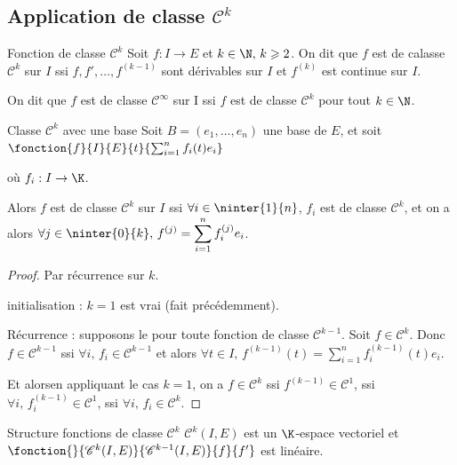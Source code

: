 \subsection{Application de classe \texorpdfstring{$\mathscr C^k$}{Ck}}

\begin{definition}{Fonction de classe $\mathscr C^k$}{}
    Soit $f : I \to E$ et $k \in \N, \, k \geqslant 2$. On dit que $f$ est de calasse 
    $\mathscr C^k$ sur $I$ ssi $f, f', \ldots, f^{(k-1)}$ sont dérivables sur $I$ et $f^{(k)}$ est continue sur $I$.

    On dit que $f$ est de classe $\mathscr C^\infty$ sur I ssi $f$ est de classe 
    $\mathscr C^k$ pour tout $k \in \N$.
\end{definition}

\begin{proposition}{Classe $\mathscr C^k$ avec une base }{}
    Soit $B = (e_1, \ldots, e_n)$ une base de $E$, et soit
    $\fonction{f}{I}{E}{t}{\sum_{i=1}^n f_i(t)e_i}$ 
    
    où $f_i : I \to \K$.

    Alors $f$ est de classe $\mathscr C^k$ sur $I$ ssi $\forall i \in \ninter{1}{n}$, $f_i$ est de classe $\mathscr C^k$, 
    et on a alors $\displaystyle \forall j \in \ninter{0}{k}, \, f^{(j)} = \sum_{i=1}^n f_i^{(j)}e_i$.
\end{proposition}


\begin{proof}
    Par récurrence sur $k$. 

    initialisation : $k = 1$ est vrai (fait précédemment).

    Récurrence : supposons le pour toute fonction de classe $\mathscr C^{k - 1} $. Soit 
    $f \in \mathscr C^k$. Donc $f \in \mathscr C^{k-1}$ ssi $\forall i, \, f_i \in \mathscr C^{k-1}$ 
    et alors $\displaystyle \forall t \in I, \, f^{(k-1)}(t) = \sum_{i=1}^n f_i^{(k-1)}(t)e_i$.

    Et alorsen appliquant le cas $k = 1$, on a $f \in \mathscr C^k$ ssi $f^{(k-1)} \in \mathscr C^1$, 
    ssi $\forall i, \, f_i^{(k-1)} \in \mathscr C^1$, ssi $\forall i, \, f_i \in \mathscr C^k$.
\end{proof}

\begin{proposition}{Structure fonctions de classe $\mathscr C^k$}{}
    $\mathscr C^k(I, E)$ est un $\K$-espace vectoriel et
    $\fonction{}{\mathscr C^k(I, E)}{\mathscr C^{k-1}(I, E)}{f}{f'}$ est linéaire.
\end{proposition}

